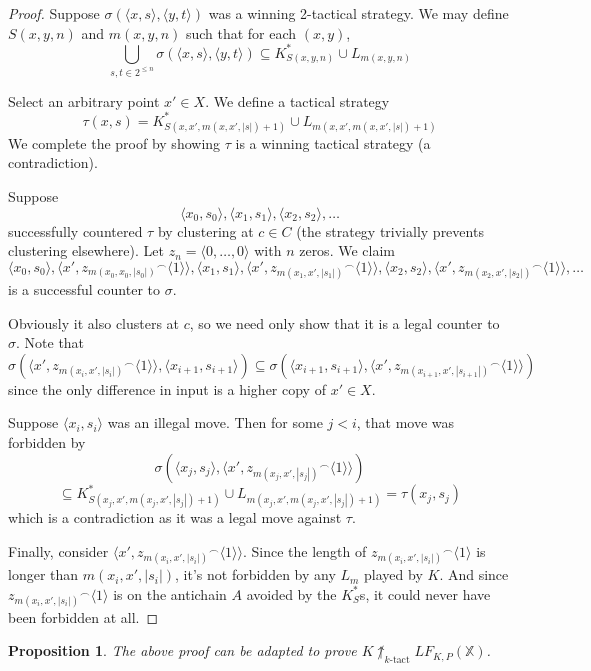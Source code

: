 \documentclass[11pt]{article}
\theoremstyle{plain}
\newtheorem{proposition}[theorem]{Proposition}
\theoremstyle{definition}
\theoremstyle{remark}
\newcommand{\ktactwin}[1]{\uparrow_{#1\text{-tact}}}
\newcommand{\lfkpgame}[1]{LF_{K,P}(#1)}
\newcommand{\<}{\langle}
\renewcommand{\>}{\rangle}
\begin{document}
\begin{proof}
Suppose $\sigma(\<x,s\>,\<y,t\>)$ was a winning 2-tactical strategy. We may define $S(x,y,n)$ and $m(x,y,n)$ such that for each $(x,y)$,
\[
\bigcup_{s,t \in 2^{\leq n}} \sigma(\<x,s\>,\<y,t\>) \subseteq K^*_{S(x,y,n)} \cup L_{m(x,y,n)}
\]

Select an arbitrary point $x' \in X$. We define a tactical strategy 
\[
\tau(x,s) = K^*_{S(x,x',m(x,x',|s|)+1)} \cup L_{m(x,x',m(x,x',|s|)+1)}
\]
We complete the proof by showing $\tau$ is a winning tactical strategy (a contradiction).

Suppose
\[
\<x_0, s_0\>, \<x_1, s_1\>, \<x_2, s_2\>, \dots
\]
successfully countered $\tau$ by clustering at $c\in C$ (the strategy trivially prevents clustering elsewhere). Let $z_n = \<0,\dots,0\>$ with $n$ zeros. We claim
\[
\<x_0, s_0\>, \<x', {z_{m(x_0,x_0,|s_0|)}}^\frown\<1\>\>, \<x_1, s_1\>, \<x', {z_{m(x_1,x',|s_1|)}}^\frown\<1\>\>,  \<x_2, s_2\>, \<x', {z_{m(x_2,x',|s_2|)}}^\frown\<1\>\>, \dots
\]
is a successful counter to $\sigma$.

Obviously it also clusters at $c$, so we need only show that it is a legal counter to $\sigma$. Note that \[\sigma(\<x', {z_{m(x_i,x',|s_i|)}}^\frown\<1\>\>, \<x_{i+1}, s_{i+1}\>) \subseteq \sigma(\<x_{i+1}, s_{i+1}\>, \<x', {z_{m(x_{i+1},x',|s_{i+1}|)}}^\frown\<1\>\>)\] since the only difference in input is a higher copy of $x'\in X$.

Suppose $\<x_{i}, s_{i}\>$ was an illegal move. Then for some $j<i$, that move was forbidden by 
\[
\sigma(\<x_{j}, s_{j}\>, \<x', {z_{m(x_{j},x',|s_{j}|)}}^\frown\<1\>\>)
\]
\[
\subseteq 
K^*_{S(x_{j},x',m(x_{j},x',|s_{j}|)+1)} \cup L_{m(x_{j},x',m(x_{j},x',|s_{j}|)+1)}
= \tau(x_j,s_j)
\]
which is a contradiction as it was a legal move against $\tau$.

Finally, consider $\<x',{z_{m(x_i,x',|s_i|)}}^\frown\<1\>\>$. Since the length of ${z_{m(x_i,x',|s_i|)}}^\frown\<1\>$ is longer than $m(x_i,x',|s_i|)$, it's not forbidden by any $L_m$ played by $K$. And since ${z_{m(x_i,x',|s_i|)}}^\frown\<1\>$ is on the antichain $A$ avoided by the $K^*_S$s, it could never have been forbidden at all.
\end{proof}

\begin{proposition}
The above proof can be adapted to prove $K\not\ktactwin{k}\lfkpgame{\mathbb{X}}$.
\end{proposition}
\end{document}
